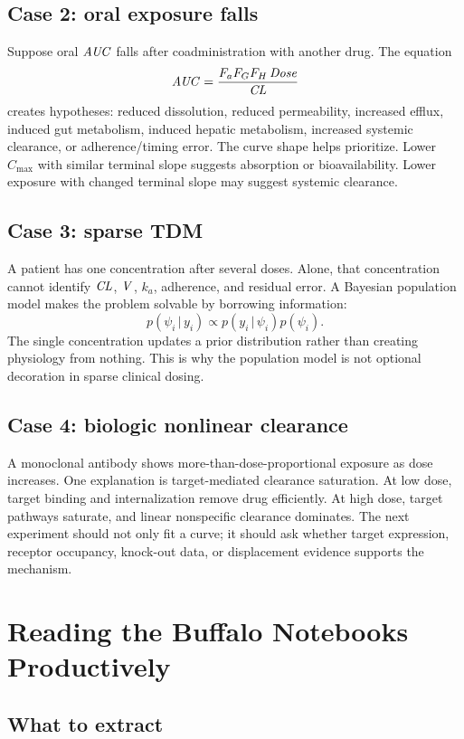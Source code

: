 \documentclass[a4paper]{article}
\newcommand{\given}{\,|\,}
\newcommand{\pkCL}{\pksym{CL}}
\newcommand{\pkV}{\pksym{V}}
\newcommand{\pkAUC}{\pksym{AUC}}
\newcommand{\pkCmax}{C_{\max}}
\begin{document}
\subsection{Case 2: oral exposure falls}

Suppose oral \(\pkAUC\) falls after coadministration with another drug. The equation
\[
  \pkAUC=\frac{F_aF_GF_H\,\pksym{Dose}}{\pkCL}
\]
creates hypotheses: reduced dissolution, reduced permeability, increased efflux, induced gut metabolism, induced hepatic metabolism, increased systemic clearance, or adherence/timing error. The curve shape helps prioritize. Lower \(\pkCmax\) with similar terminal slope suggests absorption or bioavailability. Lower exposure with changed terminal slope may suggest systemic clearance.

\subsection{Case 3: sparse TDM}

A patient has one concentration after several doses. Alone, that concentration cannot identify \(\pkCL\), \(\pkV\), \(k_a\), adherence, and residual error. A Bayesian population model makes the problem solvable by borrowing information:
\[
  p(\psi_i\given y_i)\propto p(y_i\given\psi_i)p(\psi_i).
\]
The single concentration updates a prior distribution rather than creating physiology from nothing. This is why the population model is not optional decoration in sparse clinical dosing.

\subsection{Case 4: biologic nonlinear clearance}

A monoclonal antibody shows more-than-dose-proportional exposure as dose increases. One explanation is target-mediated clearance saturation. At low dose, target binding and internalization remove drug efficiently. At high dose, target pathways saturate, and linear nonspecific clearance dominates. The next experiment should not only fit a curve; it should ask whether target expression, receptor occupancy, knock-out data, or displacement evidence supports the mechanism.

\section{Reading the Buffalo Notebooks Productively}

\subsection{What to extract}
\end{document}
